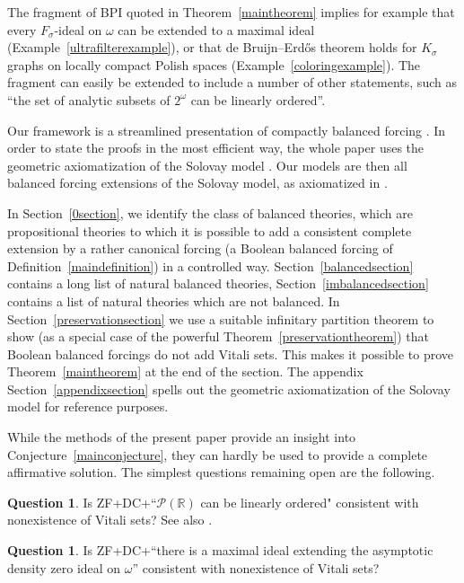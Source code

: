 \documentclass{article}
\newcommand{\gw}{\omega}
\newcommand{\gs}{\sigma}
\newcommand{\cantor}{2^\gw}
\newcommand{\power}{\mathcal{P}}
\theoremstyle{definition}
\newtheorem{question}[theorem]{Question}
\begin{document}
\noindent The fragment of BPI quoted in Theorem~\ref{maintheorem} implies for example that every $F_\gs$-ideal on $\gw$ can be extended to a maximal ideal (Example~\ref{ultrafilterexample}), or that de Bruijn--Erd{\H o}s theorem holds for $K_\gs$ graphs on locally compact Polish spaces (Example~\ref{coloringexample}). The fragment can easily be extended to include a number of other statements, such as ``the set of analytic subsets of $\cantor$ can be linearly ordered''.

Our framework is a streamlined presentation of compactly balanced forcing \cite[Section 9.2]{z:geometric}. In order to state the proofs in the most efficient way, the whole paper uses the geometric axiomatization of the Solovay model \cite{z:reloadedA}. Our models are then all balanced forcing extensions of the Solovay model, as axiomatized in \cite{z:reloadedB}. 

In Section~\ref{0section}, we identify the class of balanced theories, which are propositional theories to which it is possible to add a consistent complete extension by a rather canonical forcing (a Boolean balanced forcing of Definition~\ref{maindefinition}) in a controlled way. Section~\ref{balancedsection} contains a long list of natural balanced theories, Section~\ref{imbalancedsection} contains a list of natural theories which are not balanced. In Section~\ref{preservationsection} we use a suitable infinitary partition theorem to show (as a special case of the powerful Theorem~\ref{preservationtheorem}) that Boolean balanced forcings do not add Vitali sets. This makes it possible to prove Theorem~\ref{maintheorem} at the end of the section. The appendix Section~\ref{appendixsection} spells out the geometric axiomatization of the Solovay model for reference purposes.

While the methods of the present paper provide an insight into Conjecture~\ref{mainconjecture}, they can hardly be used to provide a complete affirmative solution. The simplest questions remaining open are the following.

\begin{question}
Is ZF+DC+``$\power(\mathbb{R})$ can be linearly ordered" consistent with nonexistence of Vitali sets? See also \cite{schilhan:ordering, pincus:addingdc}.
\end{question}

\begin{question}
Is ZF+DC+``there is a maximal ideal extending the asymptotic density zero ideal on $\gw$'' consistent with nonexistence  of Vitali sets?
\end{question}
\end{document}
